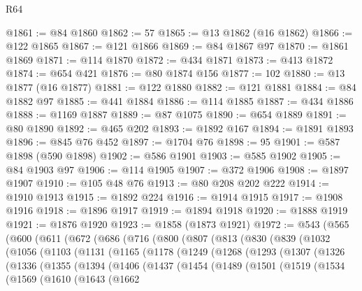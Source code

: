 \begin{lexlean}{R64}
\begin{coremodule}
@1861 := @84 @1860
@1862 := 57
@1865 := @13 @1862 (@16 @1862)
@1866 := @122 @1865
@1867 := @121 @1866
@1869 := @84 @1867 @97
@1870 := @1861 @1869
@1871 := @114 @1870
@1872 := @434 @1871
@1873 := @413 @1872
@1874 := @654 @421
@1876 := @80 @1874 @156
@1877 := 102
@1880 := @13 @1877 (@16 @1877)
@1881 := @122 @1880
@1882 := @121 @1881
@1884 := @84 @1882 @97
@1885 := @441 @1884
@1886 := @114 @1885
@1887 := @434 @1886
@1888 := @1169 @1887
@1889 := @87 @1075
@1890 := @654 @1889
@1891 := @80 @1890
@1892 := @465 @202
@1893 := @1892 @167
@1894 := @1891 @1893
@1896 := @845 @76 @452
@1897 := @1704 @76
@1898 := 95
@1901 := @587 @1898 (@590 @1898)
@1902 := @586 @1901
@1903 := @585 @1902
@1905 := @84 @1903 @97
@1906 := @114 @1905
@1907 := @372 @1906
@1908 := @1897 @1907
@1910 := @105 @48 @76
@1913 := @80 @208 @202 @222
@1914 := @1910 @1913
@1915 := @1892 @224
@1916 := @1914 @1915
@1917 := @1908 @1916
@1918 := @1896 @1917
@1919 := @1894 @1918
@1920 := @1888 @1919
@1921 := @1876 @1920
@1923 := @1858 (@1873 @1921)
@1972 := @543
    (@565
      (@600
        (@611
          (@672
            (@686
              (@716
                (@800
                  (@807
                    (@813
                      (@830
                        (@839
                          (@1032
                            (@1056
                              (@1103
                                (@1131
                                  (@1165
                                    (@1178
                                      (@1249
                                        (@1268
                                          (@1293
                                            (@1307
                                              (@1326
                                                (@1336
                                                  (@1355
                                                    (@1394
                                                      (@1406
                                                        (@1437
                                                          (@1454
                                                            (@1489
                                                              (@1501
                                                                (@1519
                                                                  (@1534
                                                                    (@1569
                                                                      (@1610
                                                                        (@1643
                                                                          (@1662

\end{coremodule}
\end{lexlean}
